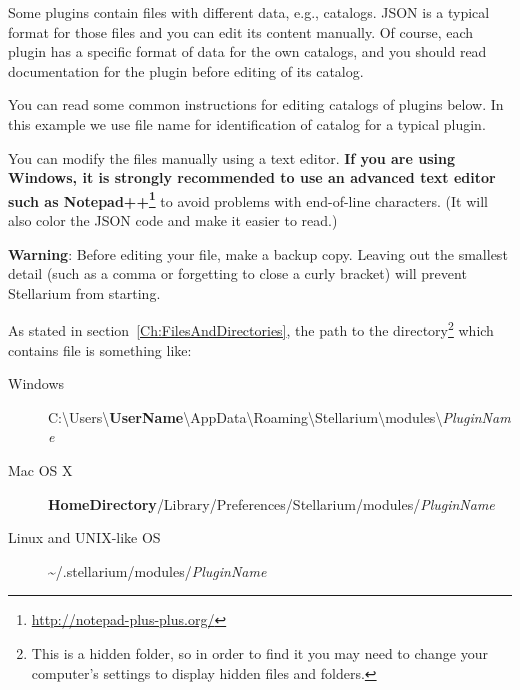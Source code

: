 Some plugins contain files with different data, e.g., catalogs. JSON is a
typical format for those files and you can edit its content manually. Of
course, each plugin has a specific format of data for the own catalogs, and
you should read documentation for the plugin before editing of its catalog.

You can read some common instructions for editing catalogs of plugins
below. In this example we use file name  for
identification of catalog for a typical plugin.

You can modify the  files manually using a text
editor. \textbf{If you are using Windows, it is strongly recommended to
use an advanced text editor such as
Notepad++\footnote{\url{http://notepad-plus-plus.org/}}} to avoid problems with
end-of-line characters. (It will also color the JSON code and make it
easier to read.)

\textbf{Warning}: Before editing your  file, make a
backup copy. Leaving out the smallest detail (such as a comma or
forgetting to close a curly bracket) will prevent Stellarium from
starting.

As stated in section~\ref{Ch:FilesAndDirectories}, the path to the
directory\footnote{This is a hidden folder, so in order to find it you
  may need to change your computer's settings to display hidden files
  and folders.} which contains  file is something
like:

\begin{description}
\item[Windows]
  C:\textbackslash Users\textbackslash\textbf{UserName}\textbackslash AppData\textbackslash Roaming\textbackslash Stellarium\textbackslash modules\textbackslash \textit{PluginName}
\item[Mac OS X]
  \textbf{HomeDirectory}/Library/Preferences/Stellarium/modules/\textit{PluginName}
\item[Linux and UNIX-like OS]
  \textasciitilde{}/.stellarium/modules/\textit{PluginName}
\end{description}



